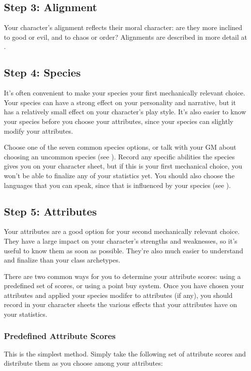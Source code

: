     \subsection{Step 3: Alignment}
        Your character's alignment reflects their moral character: are they more inclined to good or evil, and to chaos or order?
        Alignments are described in more detail at .

    \subsection{Step 4: Species}
        It's often convenient to make your species your first mechanically relevant choice.
        Your species can have a strong effect on your personality and narrative, but it has a relatively small effect on your character's play style.
        It's also easier to know your species before you choose your attributes, since your species can slightly modify your attributes.

        Choose one of the seven common species options, or talk with your GM about choosing an uncommon species (see ).
        Record any specific abilities the species gives you on your character sheet, but if this is your first mechanical choice, you won't be able to finalize any of your statistics yet.
        You should also choose the languages that you can speak, since that is influenced by your species (see ).

    \subsection{Step 5: Attributes}
        Your attributes are a good option for your second mechanically relevant choice.
        They have a large impact on your character's strengths and weaknesses, so it's useful to know them as soon as possible.
        They're also much easier to understand and finalize than your class archetypes.

        There are two common ways for you to determine your attribute scores: using a predefined set of scores, or using a point buy system.
        Once you have chosen your attributes and applied your species modifer to attributes (if any), you should record in your character sheets the various effects that your attributes have on your statistics.

        \subsubsection{Predefined Attribute Scores}
            This is the simplest method.
            Simply take the following set of attribute scores and distribute them as you choose among your attributes:

